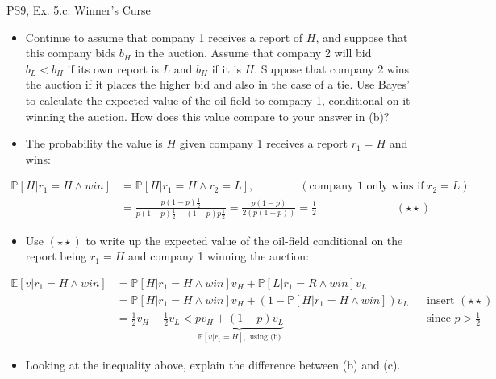 \begin{frame}{PS9, Ex. 5.c: Winner's Curse}
      \begin{itemize}
        \item[(c)] Continue to assume that company 1 receives a report of $H$, and suppose that this company bids $b_H$ in the auction. Assume that company 2 will bid $b_L < b_H$ if its own report is $L$ and $b_H$ if it is $H$. Suppose that company 2 wins the auction if it places the higher bid and also in the case of a tie. Use Bayes’ to calculate the expected value of the oil field to company 1, conditional on it winning the auction. How does this value compare to your answer in (b)?
        \item[Step 1:] The probability the value is $H$ given company 1 receives a report $r_1=H$ and wins:
        \end{itemize}
        \vspace{-8pt}
        \begin{align*}
          \mathbb{P}[H|r_1=H\wedge win]&=\mathbb{P}[H|r_1=H\wedge r_2=L],\quad\quad\quad\quad(\text{company 1 only wins if }r_2=L)\\
            &=\frac{p(1-p)\frac{1}{2}}{p(1-p)\frac{1}{2}+(1-p)p\frac{1}{2}}=\frac{p(1-p)}{2(p(1-p))}=\frac{1}{2}\quad\quad\quad\quad\quad\quad\quad(\star\star)
        \end{align*}
        \vspace{-8pt}
        \begin{itemize}
        \item[Step 2:] Use $(\star\star)$ to write up the expected value of the oil-field conditional on the report being $r_1=H$ and company 1 winning the auction:
      \end{itemize}
      \vspace{-4pt}
      \begin{align*}
        \mathbb{E}[v|r_1=H\wedge win]&=\mathbb{P}[H|r_1=H\wedge win]v_H+\mathbb{P}[L|r_1=R\wedge win]v_L\\
        &=\mathbb{P}[H|r_1=H\wedge win]v_H+\left(1-\mathbb{P}[H|r_1=H\wedge win]\right)v_L&&\text{insert }(\star\star)\\
        &=\frac{1}{2}v_H+\frac{1}{2}v_L<\underbrace{pv_H+(1-p)v_L}_{\textstyle\mathbb{E}[v|r_1=H],\text{ using (b)}}&&\text{since }p>\frac{1}{2}
      \end{align*}
      \vspace{-10pt}
      \begin{itemize}
        \item[Step 3:] Looking at the inequality above, explain the difference between (b) and (c).
      \end{itemize}
      \vfill\null
\end{frame}
